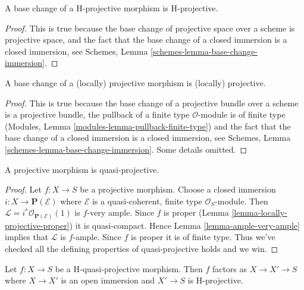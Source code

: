 \begin{lemma}
\label{lemma-H-projective-base-change}
A base change of a H-projective morphism is H-projective.
\end{lemma}

\begin{proof}
This is true because the base change of projective space
over a scheme is projective space, and the fact that the base
change of a closed immersion is a closed immersion, see
Schemes, Lemma \ref{schemes-lemma-base-change-immersion}.
\end{proof}

\begin{lemma}
\label{lemma-base-change-projective}
A base change of a (locally) projective morphism is (locally) projective.
\end{lemma}

\begin{proof}
This is true because the base change of a projective bundle
over a scheme is a projective bundle, the pullback of
a finite type $\mathcal{O}$-module is of finite type
(Modules, Lemma \ref{modules-lemma-pullback-finite-type})
and the fact that the base
change of a closed immersion is a closed immersion, see
Schemes, Lemma \ref{schemes-lemma-base-change-immersion}.
Some details omitted.
\end{proof}

\begin{lemma}
\label{lemma-projective-quasi-projective}
A projective morphism is quasi-projective.
\end{lemma}

\begin{proof}
Let $f : X \to S$ be a projective morphism. Choose a closed immersion
$i : X \to \mathbf{P}(\mathcal{E})$ where $\mathcal{E}$ is a quasi-coherent,
finite type $\mathcal{O}_S$-module. Then
$\mathcal{L} = i^*\mathcal{O}_{\mathbf{P}(\mathcal{E})}(1)$ is $f$-very ample.
Since $f$ is proper (Lemma \ref{lemma-locally-projective-proper})
it is quasi-compact. Hence Lemma \ref{lemma-ample-very-ample} implies
that $\mathcal{L}$ is $f$-ample. Since $f$ is proper it is of finite type.
Thus we've checked all the defining properties of quasi-projective
holds and we win.
\end{proof}

\begin{lemma}
\label{lemma-H-quasi-projective-open-H-projective}
Let $f : X \to S$ be a H-quasi-projective morphism.
Then $f$ factors as $X \to X' \to S$ where $X \to X'$ is an
open immersion and $X' \to S$ is H-projective.
\end{lemma}

